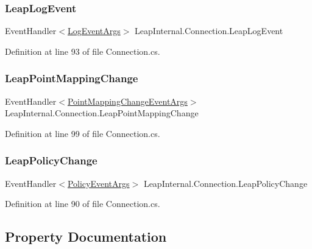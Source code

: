\subsubsection{\texorpdfstring{LeapLogEvent}{LeapLogEvent}}
{\footnotesize\ttfamily Event\+Handler$<$\mbox{\hyperlink{class_leap_1_1_log_event_args}{Log\+Event\+Args}}$>$ Leap\+Internal.\+Connection.\+Leap\+Log\+Event}



Definition at line 93 of file Connection.\+cs.

\mbox{\label{class_leap_internal_1_1_connection_ae000281d4cf2fbced911ff97b31f4035}} 
\subsubsection{\texorpdfstring{LeapPointMappingChange}{LeapPointMappingChange}}
{\footnotesize\ttfamily Event\+Handler$<$\mbox{\hyperlink{class_leap_1_1_point_mapping_change_event_args}{Point\+Mapping\+Change\+Event\+Args}}$>$ Leap\+Internal.\+Connection.\+Leap\+Point\+Mapping\+Change}



Definition at line 99 of file Connection.\+cs.

\mbox{\label{class_leap_internal_1_1_connection_ac3d23b7ad9ca1224f70f1718873bb1c2}} 
\subsubsection{\texorpdfstring{LeapPolicyChange}{LeapPolicyChange}}
{\footnotesize\ttfamily Event\+Handler$<$\mbox{\hyperlink{class_leap_1_1_policy_event_args}{Policy\+Event\+Args}}$>$ Leap\+Internal.\+Connection.\+Leap\+Policy\+Change}



Definition at line 90 of file Connection.\+cs.



\subsection{Property Documentation}
\mbox{\label{class_leap_internal_1_1_connection_a57ca44db295ca2da43050d4eb608e23c}} 
